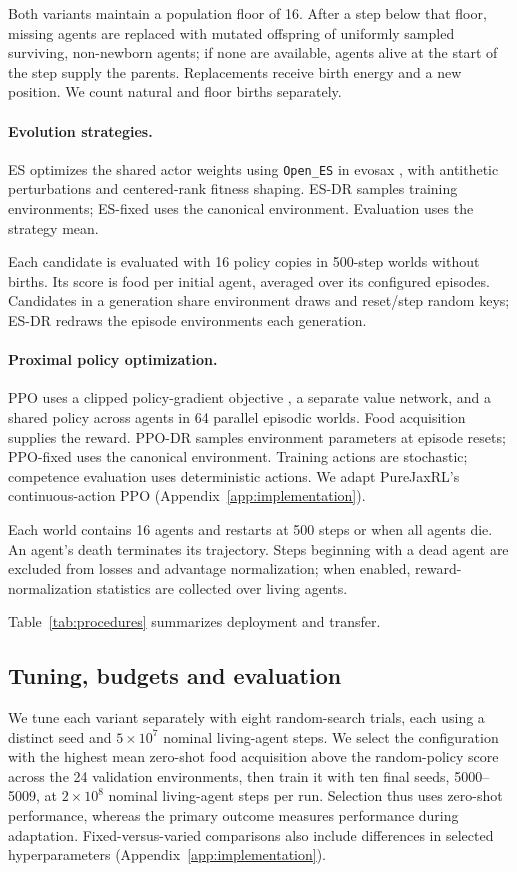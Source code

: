 Both variants maintain a population floor of 16. After a step below that floor, missing agents are replaced with mutated offspring of uniformly sampled surviving, non-newborn agents; if none are available, agents alive at the start of the step supply the parents. Replacements receive birth energy and a new position. We count natural and floor births separately.

\paragraph{Evolution strategies.}
ES optimizes the shared actor weights using \texttt{Open\_ES} in evosax \citep{salimans2017evolution,lange2023evosax}, with antithetic perturbations and centered-rank fitness shaping. ES-DR samples training environments; ES-fixed uses the canonical environment. Evaluation uses the strategy mean.

Each candidate is evaluated with 16 policy copies in 500-step worlds without births. Its score is food per initial agent, averaged over its configured episodes. Candidates in a generation share environment draws and reset/step random keys; ES-DR redraws the episode environments each generation.

\paragraph{Proximal policy optimization.}
PPO uses a clipped policy-gradient objective \citep{schulman2017proximal}, a separate value network, and a shared policy across agents in 64 parallel episodic worlds. Food acquisition supplies the reward. PPO-DR samples environment parameters at episode resets; PPO-fixed uses the canonical environment. Training actions are stochastic; competence evaluation uses deterministic actions. We adapt PureJaxRL's continuous-action PPO (Appendix~\ref{app:implementation}).

Each world contains 16 agents and restarts at 500 steps or when all agents die. An agent's death terminates its trajectory. Steps beginning with a dead agent are excluded from losses and advantage normalization; when enabled, reward-normalization statistics are collected over living agents.

Table~\ref{tab:procedures} summarizes deployment and transfer.



\subsection{Tuning, budgets and evaluation}
We tune each variant separately with eight random-search trials, each using a distinct seed and $5\times10^7$ nominal living-agent steps. We select the configuration with the highest mean zero-shot food acquisition above the random-policy score across the 24 validation environments, then train it with ten final seeds, 5000--5009, at $2\times10^8$ nominal living-agent steps per run. Selection thus uses zero-shot performance, whereas the primary outcome measures performance during adaptation. Fixed-versus-varied comparisons also include differences in selected hyperparameters (Appendix~\ref{app:implementation}).

